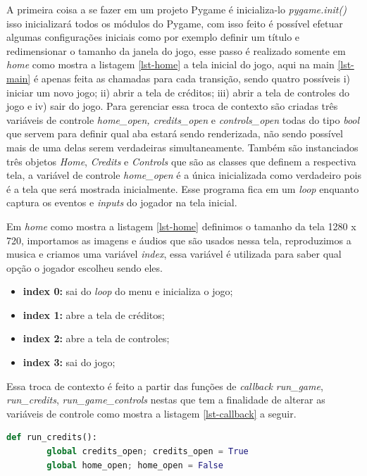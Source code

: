 
\clearpage
A primeira coisa a se fazer em um projeto Pygame é inicializa-lo \textit{pygame.init()} isso inicializará todos os módulos do Pygame, com isso feito é possível efetuar algumas configurações iniciais como por exemplo definir um título e redimensionar o tamanho da janela do jogo, esse passo é realizado somente em \textit{home} como mostra a listagem \ref{lst-home} a tela inicial do jogo, aqui na main \ref{lst-main} é apenas feita as chamadas para cada transição, sendo quatro possíveis i) iniciar um novo jogo; ii) abrir a tela de créditos; iii) abrir a tela de controles do jogo e iv) sair do jogo. Para gerenciar essa troca de contexto são criadas três variáveis de controle \textit{home\_open, credits\_open} e \textit{controls\_open} todas do tipo \textit{bool} que servem para definir qual aba estará sendo renderizada, não sendo possível mais de uma delas serem verdadeiras simultaneamente. Também são instanciados três objetos \textit{Home}, \textit{Credits} e \textit{Controls} que são as classes que definem a respectiva tela, a variável de controle \textit{home\_open} é a única inicializada como verdadeiro pois é a tela que será mostrada inicialmente. Esse programa fica em um \textit{loop} enquanto captura os eventos e \textit{inputs} do jogador na tela inicial.



Em \textit{home} como mostra a listagem \ref{lst-home} definimos o tamanho da tela 1280 x 720, importamos as imagens e áudios que são usados nessa tela, reproduzimos a musica e criamos uma variável \textit{index}, essa variável é utilizada para saber qual opção o jogador escolheu sendo eles.
\begin{itemize}
    \item \textbf{index 0:} sai do \textit{loop} do menu e inicializa o jogo;
    \item \textbf{index 1:} abre a tela de créditos; 
    \item \textbf{index 2:} abre a tela de controles;
    \item \textbf{index 3:} sai do jogo;
\end{itemize}
Essa troca de contexto é feito a partir das funções de \textit{callback} \textit{run\_game}, \textit{run\_credits}, \textit{run\_game\_controls} nestas que tem a finalidade de alterar as variáveis de controle como mostra a listagem \ref{lst-callback} a seguir. 
\begin{lstlisting}[label= lst-callback,language=Python,breaklines, caption= Função de \textit{callback} responsávél por alterar a variável de controle.]
    def run_credits():
        global credits_open; credits_open = True
        global home_open; home_open = False
\end{lstlisting}

